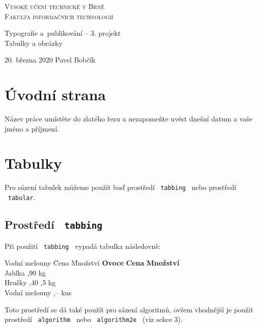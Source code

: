 \documentclass[a4paper, 11pt]{article}
\begin{document}
\begin{titlepage}
    \begin{center}
        \thispagestyle{empty}
        {\Huge \textsc{Vysoké učení technické v Brně\\[0.4em]}}
        {\huge \textsc{Fakulta informačních technologií}}
        
        
        {\LARGE Typografie a~publikování -- 3. projekt\\[0.3em]}
        {\Huge Tabulky a obrázky}
    \end{center}
{\Large 20. března 2020 \hfill Pavel Bobčík}
\end{titlepage}

\pagebreak

\section{Úvodní strana}
Název práce umístěte do zlatého řezu a nezapomeňte uvést dnešní datum a vaše jméno a příjmení.

\section{Tabulky}
Pro sázení tabulek můžeme použít buď prostředí \ \texttt{tabbing} \ nebo prostředí \ \texttt{tabular}.

\subsection{Prostředí \ \texttt{tabbing}}
Při použití \ \texttt{tabbing} \ vypadá tabulka následovně:
\begin{tabbing}
    Vodní melouny \quad \= Cena \quad \= Množství \kill
    \textbf{Ovoce} \> \textbf{Cena} \> \textbf{Množství} \\
    Jablka ,90  kg \\
    Hrušky ,40 ,5 kg \\
    Vodní melouny ,--  kus \\
\end{tabbing}
Toto prostředí se dá také použít pro sázení algoritmů, ovšem vhodnější je použít prostředí \ \texttt{algorithm} \ nebo \ \texttt{algorithm2e} \ (viz sekce 3).
\end{document}
